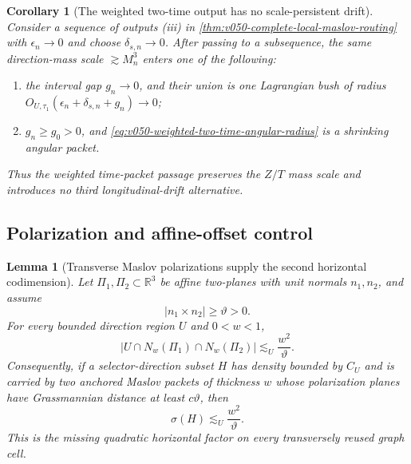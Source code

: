 \documentclass[10pt]{article}
\newtheorem{lemma}[theorem]{Lemma}
\newtheorem{corollary}[theorem]{Corollary}
\begin{document}
\begin{corollary}[The weighted two-time output has no scale-persistent drift]
\label{cor:v050-two-time-scale-persistence}
Consider a sequence of outputs \textnormal{(iii)} in
\cref{thm:v050-complete-local-maslov-routing} with
\(\epsilon_n\to0\) and choose \(\delta_{s,n}\to0\).  After passing to a subsequence, the same
direction-mass scale \(\gtrsim M_n^3\) enters one of the following:
\begin{enumerate}[label=\textnormal{(\roman*)}]
\item the interval gap \(g_n\to0\), and their union is one Lagrangian bush of radius
\(O_{U,\tau_1}(\epsilon_n+\delta_{s,n}+g_n)\to0\);
\item \(g_n\ge g_0>0\), and
\eqref{eq:v050-weighted-two-time-angular-radius} is a shrinking angular packet.
\end{enumerate}
Thus the weighted time-packet passage preserves the \(Z/T\) mass scale and introduces no third
longitudinal-drift alternative.
\end{corollary}

\subsection{Polarization and affine-offset control}

\begin{lemma}[Transverse Maslov polarizations supply the second horizontal codimension]
\label{lem:v053-transverse-polarization-intersection}
Let \(\Pi_1,\Pi_2\subset\mathbb R^3\) be affine two-planes with unit normals \(n_1,n_2\), and assume
\[
|n_1\times n_2|\ge\vartheta>0.
\]
For every bounded direction region \(U\) and \(0<w<1\),
\begin{equation}
\label{eq:v053-two-plane-tube-volume}
\boxed{
\left|
U\cap N_w(\Pi_1)\cap N_w(\Pi_2)
\right|
\lesssim_U
\frac{w^2}{\vartheta}.
}
\end{equation}
Consequently, if a selector-direction subset \(H\) has density bounded by \(C_U\) and is carried by
two anchored Maslov packets of thickness \(w\) whose polarization planes have Grassmannian distance
at least \(c\vartheta\), then
\begin{equation}
\label{eq:v053-transverse-polarization-mass}
\boxed{
\sigma(H)
\lesssim_U
\frac{w^2}{\vartheta}.
}
\end{equation}
This is the missing quadratic horizontal factor on every transversely reused graph cell.
\end{lemma}
\end{document}
